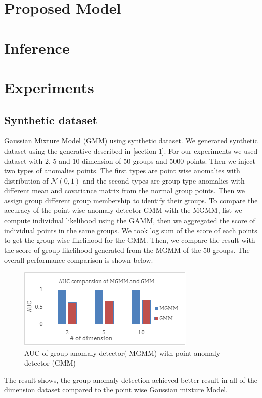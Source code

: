 \documentclass[letterpaper]{article}
\begin{document}
\section{Proposed Model}
\section{Inference}
\section{Experiments}
\subsection{Synthetic dataset}
Gaussian Mixture Model (GMM) using synthetic dataset. We generated synthetic dataset using the generative described in [section 1]. For our experiments we used dataset with 2, 5 and 10 dimension of 50 groups and 5000 points. Then we inject two types of anomalies points. The first types are point wise anomalies with distribution of $ \mathcal{N} (0,1) $ and the second types are group type anomalies with different mean and covariance matrix from the normal group points. Then we assign group different group membership to identify their groups.
To compare the accuracy of the point wise anomaly detector GMM with the MGMM, fist we compute individual likelihood using the GAMM, then we aggregated the score of individual points in the same groups. We took log sum of the score of each points to get the group wise likelihood for the GMM.  Then, we compare the result with the score of group likelihood generated from the MGMM of the 50 groups. The overall performance comparison is shown below.
\begin{figure}
\includegraphics{synthetic.png}
\caption{AUC of group anomaly detector( MGMM) with point anomaly detector (GMM)}
\end{figure}
The result shows, the group anomaly detection achieved better result in all of the dimension dataset compared to the point wise Gaussian mixture Model. 
\end{document}
